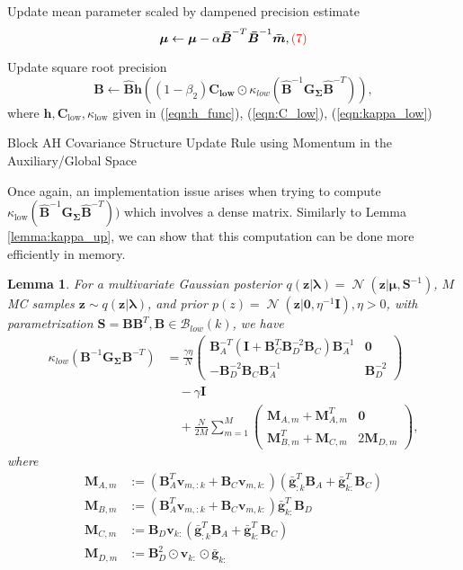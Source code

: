 \documentclass[a4paper, 11pt, oneside]{scrartcl}
\theoremstyle{break}
\newtheorem{lemma}{Lemma}[section]
\DeclareMathOperator{\Normal}{\mathcal{N}}
\newcommand{\matr}[1]{\boldsymbol{#1}}
\newcommand{\set}[1]{\mathcal{#1}}
\numberwithin{equation}{section}
\begin{document}
\begin{algorithm}[!htbp]
{						Update mean parameter scaled by dampened precision estimate
						$$\matr{\mu} \leftarrow \matr{\mu} - \alpha \matr{\bar{B}}^{-T} \matr{\bar{B}}^{-1} \matr{\bar{m}}, \color{red} \text{(7)} \color{black}$$

						Update square root precision
						$$\matr{\hat{B}} \leftarrow \matr{\hat{B}} \matr{h}((1 - \beta_2) \matr{C_{low}} \odot \kappa_{low}(\matr{\hat{B}}^{-1} \matr{G_{\Sigma}} \matr{\hat{B}}^{-T})),$$
						where $\matr{h}, \matr{C}_{\text{low}}, \kappa_{\text{low}}$ given in (\ref{eqn:h_func}), (\ref{eqn:C_low}), (\ref{eqn:kappa_low})
					}
					\caption{Block AH Covariance Structure Update Rule using Momentum in the Auxiliary/Global Space}
					\label{alg:arrowhead}
				\end{algorithm}

				Once again, an implementation issue arises when trying to compute $\kappa_{\text{low}}(\matr{\hat{B}}^{-1} \matr{G_{\Sigma}} \matr{\hat{B}}^{-T}))$ which involves a dense matrix. 
				Similarly to Lemma \ref{lemma:kappa_up}, we can show that this computation can be done more efficiently in memory.
				\begin{lemma}
					For a multivariate Gaussian posterior $q(\matr{z} | \matr{\lambda}) = \Normal(\matr{z} | \matr{\mu}, \matr{S}^{-1})$, $M$ MC samples $\matr{z} \sim q(\matr{z} | \matr{\lambda})$, and prior $p(z) = \Normal(\matr{z} | \matr{0}, \eta^{-1} \matr{I}), \eta > 0$, with parametrization $\matr{S} = \matr{B} \matr{B}^T, \matr{B} \in \set{B}_{low}(k)$, we have
						\begin{align*}
							\kappa_{low}(\matr{B}^{-1} \matr{G_{\Sigma}} \matr{B}^{-T}) &= \frac{\gamma \eta}{N}\begin{pmatrix} \matr{B}_A^{-T} (\matr{I} + \matr{B}_C^T \matr{B}_D^{-2} \matr{B}_C) \matr{B}_A^{-1} & \matr{0} \\ -\matr{B}_D^{-2} \matr{B}_C \matr{B}_A^{-1} & \matr{B}_D^{-2} \end{pmatrix} \\
							&\quad - \gamma \matr{I} \\
							&\quad + \frac{N}{2 M} \sum_{m=1}^M \begin{pmatrix} \matr{M}_{A, m} + \matr{M}_{A, m}^T & \matr{0} \\ \matr{M}_{B, m}^T + \matr{M}_{C, m} & 2\matr{M}_{D, m} \end{pmatrix},
						\end{align*}
						where 
						\begin{align*}
							\matr{M}_{A, m} &:= (\matr{B}_A^T \matr{v}_{m, :k} + \matr{B}_C \matr{v}_{m, k:}) (\matr{\bar{g}}_{:k}^T \matr{B}_A + \matr{\bar{g}}_{k:}^T \matr{B}_C) \\
							\matr{M}_{B, m} &:= (\matr{B}_A^T \matr{v}_{m, :k} + \matr{B}_C \matr{v}_{m, k:}) \matr{\bar{g}}_{k:}^T \matr{B}_D \\
							\matr{M}_{C, m} &:= \matr{B}_D \matr{v}_{k:} (\matr{\bar{g}}_{:k}^T \matr{B}_A + \matr{\bar{g}}_{k:}^T \matr{B}_C ) \\
							\matr{M}_{D, m} &:= \matr{B}_D^2 \odot \matr{v}_{k:} \odot \matr{\bar{g}}_{k:}
						\end{align*}
						\label{lemma:kappa_low}
				\end{lemma}
\end{document}
